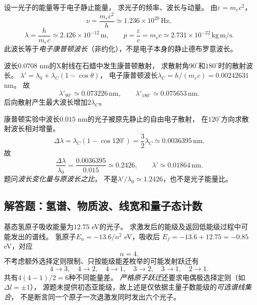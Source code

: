 \problemtext 设一光子的能量等于电子静止能量，
求光子的频率、波长与动量。
\workings
由$\varepsilon=m_ec^2$，
\[
\boxed{\nu=\frac{m_ec^2}{h}
\simeq1.236\times10^{20}\,\mathrm{Hz}},
\]
\[
\boxed{\lambda=\frac{h}{m_ec}
\simeq2.426\times10^{-12}\,\mathrm m},\qquad
\boxed{p=\frac{\varepsilon}{c}=m_ec
\simeq2.731\times10^{-22}\,\mathrm{kg\,m/s}}.
\]
\crosscheck 此波长等于\emph{电子康普顿波长}（非约化），不是电子本身的静止德布罗意波长。

\problemtext 波长$0.0708$ nm的X射线在石蜡中发生康普顿散射，
求散射角$90^\circ$和$180^\circ$时的散射波长。
\workings
$\lambda'=\lambda_0+\lambda_C(1-\cos\theta)$，
电子康普顿波长$\lambda_C=h/(m_ec)=0.00242631$ nm。
故
\[
\boxed{\lambda'_{90^\circ}\simeq0.073226\,\mathrm{nm}},
\qquad
\boxed{\lambda'_{180^\circ}\simeq0.075653\,\mathrm{nm}}.
\]
\crosscheck 后向散射产生最大波长增加$2\lambda_C$。

\problemtext 康普顿实验中波长$0.015$ nm的光子被原先静止的自由电子散射，
在$120^\circ$方向求散射波长相对增量。
\workings
\[
\Delta\lambda=\lambda_C(1-\cos120^\circ)
=\frac32\lambda_C\simeq0.0036395\,\mathrm{nm}.
\]
故
\[
\boxed{\frac{\Delta\lambda}{\lambda_0}
=\frac{0.0036395}{0.015}\simeq0.2426},
\qquad
\boxed{\lambda'\simeq0.01864\,\mathrm{nm}}.
\]
\crosscheck 题问\emph{波长变化量与原波长之比}，
不是$\lambda'/\lambda_0\simeq1.2426$，也不是光子能量比。

\subsection{解答题：氢谱、物质波、线宽和量子态计数}

\problemtext 基态氢原子吸收能量为$12.75$ eV的光子。
求激发后的能级及返回低能级过程中可能发出的谱线。
\workings
氢原子$E_n=-13.6/n^2$ eV，吸收后
$E_f=-13.6+12.75=-0.85$ eV，对应
\[
\boxed{n=4}.
\]
不考虑额外选择定则限制、只按能级能差枚举的可能发射跃迁有
\[
\boxed{4\to3,\quad4\to2,\quad4\to1,\quad
3\to2,\quad3\to1,\quad2\to1}.
\]
共有$4(4-1)/2=6$种不同能量差。
\crosscheck \emph{严格原子跃迁}还要求电偶极选择定则（如$\Delta l=\pm1$），
源题未提供初态亚能级，故上述是仅依据主量子数能级的\emph{可选谱线集合}，
不是断言同一个原子一次退激发同时发出六个光子。

